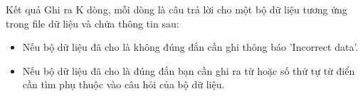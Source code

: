 Kết quả
Ghi ra K dòng, mỗi dòng là câu trả lời cho một bộ dữ liệu tương ứng trong file dữ liệu và chứa thông tin sau:  
\begin{itemize}
	\item     Nếu bộ dữ liệu đã cho là không đúng đắn cần ghi thông báo 'Incorrect data'.   
	\item     Nếu bộ dữ liệu đã cho là đúng đắn bạn cần ghi ra từ hoặc số thứ tự từ điển cần tìm phụ thuộc vào câu hỏi của bộ dữ liệu.   
\end{itemize}